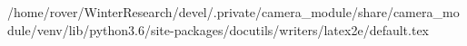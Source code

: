 /home/rover/WinterResearch/devel/.private/camera_module/share/camera_module/venv/lib/python3.6/site-packages/docutils/writers/latex2e/default.tex